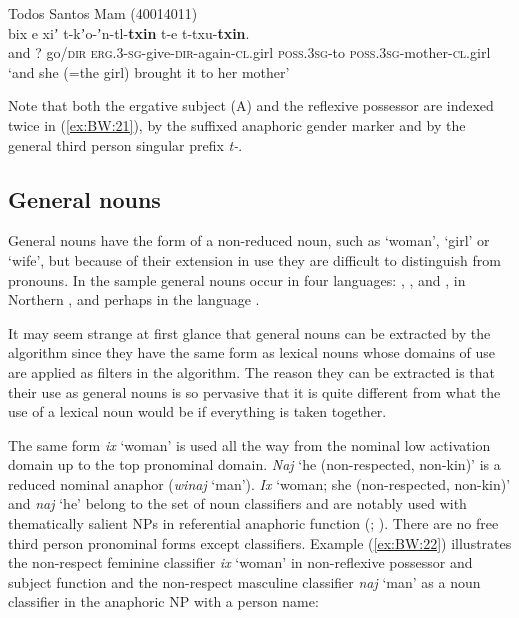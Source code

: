 \documentclass[output=collectionpaper]{langsci/langscibook}
\begin{document}
\ea\label{ex:BW:21}
Todos Santos Mam (40014011)\\
\gll [...]	bix	e	xiʼ	t-kʼo-ʼn-tl-\textbf{txin}	t-e	t-txu-\textbf{txin}.	\\
{} 	and	?	go/\textsc{dir}	\textsc{erg.3-sg}-give-\textsc{dir}-again-\textsc{cl}.girl	\textsc{poss.3sg}-to	\textsc{poss.3sg}-mother-\textsc{cl}.girl\\
\glt ‘and she (=the girl) brought it to her mother’\\
\z

Note that both the ergative subject (A) and the reflexive possessor are indexed twice in (\ref{ex:BW:21}), by the suffixed anaphoric gender marker and by the general third person singular prefix \textit{t-}.

\subsection{General nouns}
\label{sec:BW:5.4}

General nouns have the form of a non-reduced noun, such as ‘woman’, ‘girl’ or ‘wife’, but because of their extension in use they are difficult to distinguish from pronouns. In the sample general nouns occur in four  languages: , ,   and , in Northern , and perhaps in the  language .

It may seem strange at first glance that general nouns can be extracted by the algorithm since they have the same form as lexical nouns whose domains of use are applied as filters in the algorithm. The reason they can be extracted is that their use as general nouns is so pervasive that it is quite different from what the use of a lexical noun would be if everything is taken together.

The same  form \textit{ix} ‘woman’ is used all the way from the nominal low activation domain up to the top pronominal domain. \textit{Naj} ‘he (non-respected, non-kin)’ is a reduced nominal anaphor (\textit{winaj} ‘man’). \textit{Ix} ‘woman; she (non-respected, non-kin)’ and \textit{naj} ‘he’ belong to the set of noun classifiers and are notably used with thematically salient NPs in referential anaphoric function (\citealt[267]{Craig1986}; \citealt[323]{Aikhenvald2000}). There are no free third person pronominal forms except classifiers. Example (\ref{ex:BW:22}) illustrates the non-respect feminine classifier \textit{ix} ‘woman’ in non-reflexive possessor and subject function and the non-respect masculine classifier \textit{naj} ‘man’ as a noun classifier in the anaphoric NP with a person name:
\end{document}
